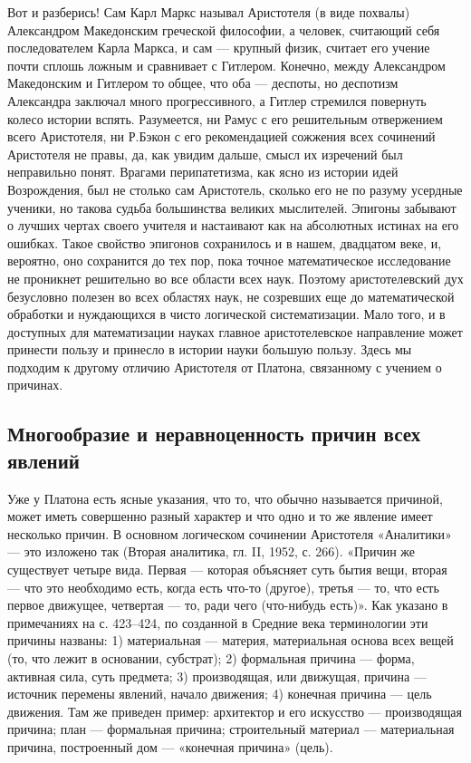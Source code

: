 Вот и  разберись! Сам Карл  Маркс называл Аристотеля (в  виде похвалы)
Александром  Македонским  греческой  философии, а  человек,  считающий
себя последователем  Карла Маркса,  и сам  --- крупный  физик, считает
его  учение почти  сплошь  ложным и  сравнивает  с Гитлером.  Конечно,
между  Александром  Македонским  и  Гитлером то  общее,  что  оба  ---
деспоты,  но деспотизм  Александра  заключал  много прогрессивного,  а
Гитлер  стремился  повернуть  колесо истории  вспять.  Разумеется,  ни
Рамус  с  его решительным  отвержением  всего  Аристотеля, ни  Р.Бэкон
с  его  рекомендацией сожжения  всех  сочинений  Аристотеля не  правы,
да,  как увидим  дальше,  смысл их  изречений  был неправильно  понят.
Врагами перипатетизма,  как ясно из  истории идей Возрождения,  был не
столько сам  Аристотель, сколько  его не  по разуму  усердные ученики,
но  такова судьба  большинства  великих  мыслителей. Эпигоны  забывают
о  лучших  чертах  своего  учителя  и  настаивают  как  на  абсолютных
истинах  на  его ошибках.  Такое  свойство  эпигонов сохранилось  и  в
нашем, двадцатом  веке, и, вероятно,  оно сохранится до тех  пор, пока
точное  математическое исследование  не  проникнет  решительно во  все
области всех  наук. Поэтому аристотелевский дух  безусловно полезен во
всех  областях  наук, не  созревших  еще  до математической  обработки
и  нуждающихся  в чисто  логической  систематизации.  Мало того,  и  в
доступных для математизации науках главное аристотелевское направление
может принести пользу и принесло в истории науки большую пользу. Здесь
мы  подходим к  другому отличию  Аристотеля от  Платона, связанному  с
учением о причинах.

\subsection{Многообразие и неравноценность причин всех явлений}

Уже  у Платона  есть ясные  указания,  что то,  что обычно  называется
причиной, может  иметь совершенно разный характер  и что одно и  то же
явление  имеет  несколько  причин.  В  основном  логическом  сочинении
Аристотеля «Аналитики» --- это изложено так (Вторая аналитика, гл. II,
1952, с. 266).  «Причин же существует четыре вида.  Первая --- которая
объясняет суть бытия  вещи, вторая --- что это  необходимо есть, когда
есть  что-то  (другое),  третья  --- то,  что  есть  первое  движущее,
четвертая  ---  то,  ради  чего  (что-нибудь  есть)».  Как  указано  в
примечаниях на с.  423--424, по созданной в  Средние века терминологии
эти причины названы: 1)  материальная --- материя, материальная основа
всех  вещей  (то, что  лежит  в  основании, субстрат);  2)  формальная
причина --- форма, активная сила,  суть предмета; 3) производящая, или
движущая, причина  --- источник перемены явлений,  начало движения; 4)
конечная причина --- цель движения. Там же приведен пример: архитектор
и его искусство --- производящая причина; план --- формальная причина;
строительный материал  --- материальная  причина, построенный  дом ---
«конечная причина» (цель).

